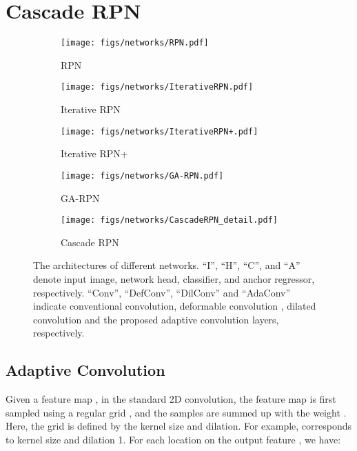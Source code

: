 \documentclass{article}
\begin{document}
	\section{Cascade RPN}
	
	\begin{figure}[t]
		\centering
		\begin{subfigure}{0.24\columnwidth}
			\centering
			\texttt{[image: figs/networks/RPN.pdf]}
			\caption{RPN}
			\label{fig:arch_rpn}
		\end{subfigure}
		\begin{subfigure}{0.36\columnwidth}
			\centering
			\texttt{[image: figs/networks/IterativeRPN.pdf]}
			\caption{Iterative RPN}
			\label{fig:arch_irpn}
		\end{subfigure}
		\begin{subfigure}{0.36\columnwidth}
			\centering
			\texttt{[image: figs/networks/IterativeRPN+.pdf]}
			\caption{Iterative RPN+}
			\label{fig:arch_irpn+}
		\end{subfigure}
		\vspace{0.2cm}
		
		\begin{subfigure}{0.36\columnwidth}
			\centering
			\texttt{[image: figs/networks/GA-RPN.pdf]}
			\caption{GA-RPN}
			\label{fig:arch_garpn}
		\end{subfigure}
		\begin{subfigure}{0.63\columnwidth}
			\centering
			\texttt{[image: figs/networks/CascadeRPN\_detail.pdf]}
			\caption{Cascade RPN}
			\label{fig:arch_crpn}
		\end{subfigure}
		
		\caption{The architectures of different networks. \enquote{I}, \enquote{H}, \enquote{C}, and \enquote{A} denote input image, network head, classifier, and anchor regressor, respectively. \enquote{Conv}, \enquote{DefConv}, \enquote{DilConv} and \enquote{AdaConv} indicate conventional convolution, deformable convolution \citep{Dai_2017_ICCV}, dilated convolution \citep{yu2015multi} and the proposed adaptive convolution layers, respectively.}
		\label{fig:arch}
	\end{figure}
	
	
	\subsection{Adaptive Convolution}
	Given a feature map , in the standard 2D convolution, the feature map is first sampled using a regular grid , and the samples are summed up with the weight . Here, the grid  is defined by the kernel size and dilation. For example,  corresponds to kernel size  and dilation 1. For each location  on the output feature , we have:
	
\end{document}
